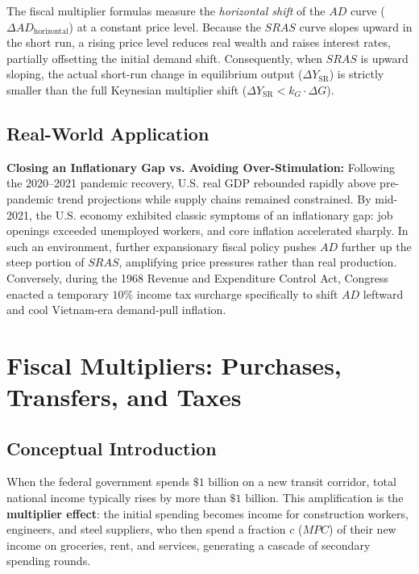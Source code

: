 \documentclass[11pt,letterpaper]{article}
\begin{document}
\begin{coreprinciple}
The fiscal multiplier formulas measure the \emph{horizontal shift} of the $AD$ curve ($\Delta AD_{\text{horizontal}}$) at a constant price level. Because the $SRAS$ curve slopes upward in the short run, a rising price level reduces real wealth and raises interest rates, partially offsetting the initial demand shift. Consequently, when $SRAS$ is upward sloping, the actual short-run change in equilibrium output ($\Delta Y_{\text{SR}}$) is strictly smaller than the full Keynesian multiplier shift ($\Delta Y_{\text{SR}} < k_G \cdot \Delta G$).
\end{coreprinciple}

\subsection*{Real-World Application}
\textbf{Closing an Inflationary Gap vs. Avoiding Over-Stimulation:} Following the 2020--2021 pandemic recovery, U.S. real GDP rebounded rapidly above pre-pandemic trend projections while supply chains remained constrained. By mid-2021, the U.S. economy exhibited classic symptoms of an inflationary gap: job openings exceeded unemployed workers, and core inflation accelerated sharply. In such an environment, further expansionary fiscal policy pushes $AD$ further up the steep portion of $SRAS$, amplifying price pressures rather than real production. Conversely, during the 1968 Revenue and Expenditure Control Act, Congress enacted a temporary $10\%$ income tax surcharge specifically to shift $AD$ leftward and cool Vietnam-era demand-pull inflation.

\section{Fiscal Multipliers: Purchases, Transfers, and Taxes}

\subsection*{Conceptual Introduction}
When the federal government spends $\$1\text{ billion}$ on a new transit corridor, total national income typically rises by more than $\$1\text{ billion}$. This amplification is the \textbf{multiplier effect}: the initial spending becomes income for construction workers, engineers, and steel suppliers, who then spend a fraction $c$ ($MPC$) of their new income on groceries, rent, and services, generating a cascade of secondary spending rounds.
\end{document}
